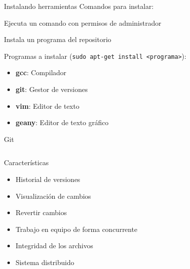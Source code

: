 \documentclass{mybeamer}
\begin{document}
\begin{framesubsec}{Instalando herramientas}
	Comandos para instalar:
	\begin{description}[align=right,labelwidth=10cm]
		\item[\texttt{sudo <comando>}:               ] Ejecuta un
			comando con permisos de administrador
		\item[\texttt{apt-get install <programa>}:   ] Instala un
			programa del repositorio
	\end{description}

	Programas a instalar (\texttt{sudo apt-get install <programa>}):
	\begin{itemize}
		\item \textbf{gcc}: Compilador
		\item \textbf{git}: Gestor de versiones
		\item \textbf{vim}: Editor de texto
		\item \textbf{geany}: Editor de texto gráfico
	\end{itemize}
\end{framesubsec}

\begin{framesec}{Git}
	\begin{columns}[c]
			\centering
			\centering
	\end{columns}
\end{framesec}


\begin{framesubsec}{Características}
	\begin{itemize}
		\item Historial de versiones
		\item Visualización de cambios
		\item Revertir cambios
		\item Trabajo en equipo de forma concurrente
		\item Integridad de los archivos
		\item Sistema distribuido
	\end{itemize}
\end{framesubsec}
\end{document}
